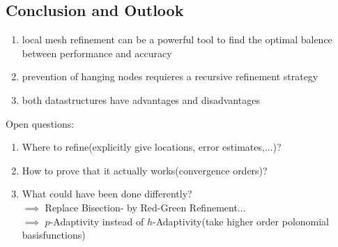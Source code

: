 \subsection{Conclusion and Outlook}
\begin{enumerate}[label = \arabic* .]
	\item local mesh refinement can be a powerful tool to find the optimal balence between performance and accuracy
	\item prevention of hanging nodes requieres a recursive refinement strategy
	\item both datastructures have advantages and disadvantages  
\end{enumerate}
Open questions:
\begin{enumerate}[label = \arabic* .]
	\item Where to refine(explicitly give locations, error estimates,...)?
	\item How to prove that it actually works(convergence orders)?
	\item What could have been done differently?\\
	$\implies$ Replace Bisection- by Red-Green Refinement...\\
	$\implies$ $p$-Adaptivity instead of $h$-Adaptivity(take higher order polonomial basisfunctions)
\end{enumerate}


